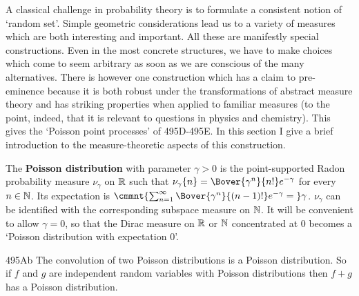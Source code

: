 
\def\chaptername{Further topics}
\def\sectionname{Poisson point processes}


A classical challenge in probability theory is to formulate a consistent
notion of `random set'.   Simple geometric considerations lead us to a
variety of measures which are both interesting and important.
All these are manifestly special constructions.   Even in the most
concrete structures, we have to make choices which come to seem
arbitrary as soon as we are conscious of the many alternatives.   There
is however one construction which has a claim to pre-eminence because it
is both robust under the transformations of abstract measure theory and
has striking properties when applied to familiar measures (to the point,
indeed, that it is relevant to questions in physics and chemistry).
This gives the `Poisson point processes' of 495D-495E.   In this section
I give a brief introduction to the measure-theoretic aspects of this
construction.

 The {\bf Poisson distribution} with parameter $\gamma>0$
is the point-supported Radon probability measure $\nu_{\gamma}$ on
$\Bbb R$ such that $\nu_{\gamma}\{n\}=\Bover{\gamma^n}{n!}e^{-\gamma}$
for every $n\in\Bbb N$.      Its
expectation is
$\cmmnt{\sum_{n=1}^{\infty}\Bover{\gamma^n}{(n-1)!}e^{-\gamma}
=\mskip5mu}\gamma$.
$\nu_{\gamma}$ can be identified with the
corresponding subspace measure on $\Bbb N$.
It will be convenient to allow $\gamma=0$, so that the Dirac
measure on $\Bbb R$ or $\Bbb N$ concentrated at $0$ becomes a `Poisson
distribution with expectation $0$'.

\spheader 495Ab The convolution of two Poisson distributions is a
Poisson distribution.   
So if $f$ and $g$ are independent random variables with Poisson
distributions then $f+g$ has a Poisson distribution.

